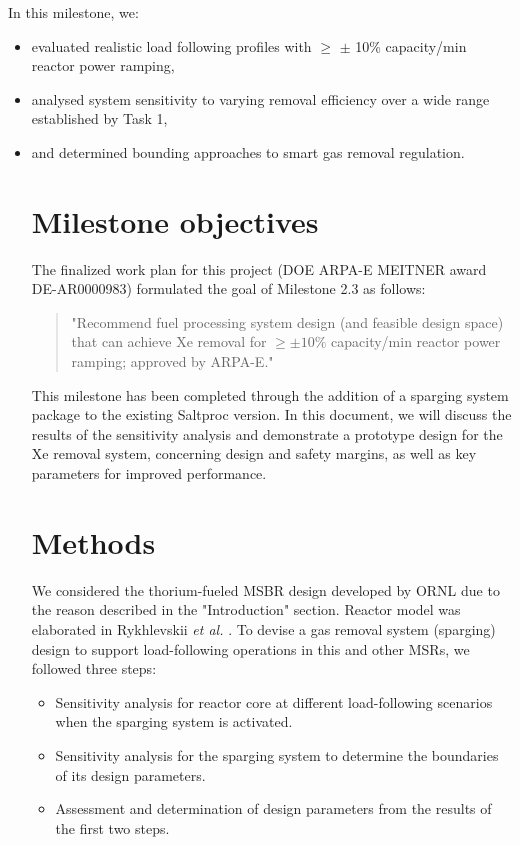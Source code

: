     In this milestone, we:
    \begin{itemize}
            \item evaluated realistic load following profiles with $\geq$ $\pm$ 10\% capacity/min reactor power ramping, 
            \item analysed system sensitivity to varying removal efficiency 
                    over a wide range established by Task 1,
            \item and determined bounding approaches to smart gas removal regulation.

\section{Milestone objectives}

    The finalized work plan for this project (DOE ARPA-E MEITNER award 
    DE-AR0000983) formulated the goal of Milestone 2.3 as follows:

    \begin{quotation}
        "Recommend fuel processing system design (and feasible design
        space) that can achieve Xe removal for $\ge \pm 10\%$ capacity/min 
            reactor power ramping; approved by ARPA-E."
    \end{quotation}

    This milestone has been completed through the addition of a sparging system 
    package to the existing Saltproc version. In this document, we will discuss 
    the results of the sensitivity analysis and demonstrate a prototype design 
    for the Xe removal system, concerning design and safety margins, as well as 
    key parameters for improved performance.

\section{Methods}

    We considered the thorium-fueled MSBR design 
    \cite{robertson_conceptual_1971} developed by ORNL due to the reason 
    described in the "Introduction" section. Reactor model was elaborated in 
    Rykhlevskii \emph{et al.} \cite{rykhlevskii_modeling_2019}.
    To devise a gas removal system (sparging) design to support load-following 
                    operations in this and other \glspl{MSR}, we followed three steps:
    \begin{itemize}
        \item Sensitivity analysis for reactor core at different load-following 
                scenarios when the sparging system is activated.
        \item Sensitivity analysis for the sparging system to determine the 
                boundaries of its design parameters.
        \item Assessment and determination of design parameters from the 
                results of the first two steps.
    \end{itemize}


\end{itemize}
